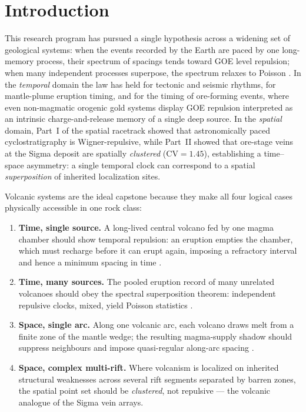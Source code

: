 \documentclass[11pt]{article}
\begin{document}
\section{Introduction}

This research program has pursued a single hypothesis across a widening set of
geological systems: when the events recorded by the Earth are paced by one
long-memory process, their spectrum of spacings tends toward GOE level
repulsion; when many independent processes superpose, the spectrum relaxes to
Poisson \citep{mehta2004,atas2013}. In the \emph{temporal} domain the law has
held for tectonic and seismic rhythms, for mantle-plume eruption timing, and
for the timing of ore-forming events, where even non-magmatic orogenic gold
systems display GOE repulsion interpreted as an intrinsic charge-and-release
memory of a single deep source. In the \emph{spatial} domain, Part~I of the
spatial racetrack showed that astronomically paced cyclostratigraphy is
Wigner-repulsive, while Part~II showed that ore-stage veins at the Sigma
deposit are spatially \emph{clustered} ($\mathrm{CV}=1.45$), establishing a
time--space asymmetry: a single temporal clock can correspond to a spatial
\emph{superposition} of inherited localization sites.

Volcanic systems are the ideal capstone because they make all four logical
cases physically accessible in one rock class:

\begin{enumerate}
\item \textbf{Time, single source.} A long-lived central volcano fed by one
magma chamber should show temporal repulsion: an eruption empties the chamber,
which must recharge before it can erupt again, imposing a refractory interval
and hence a minimum spacing in time \citep{sparks2003}.
\item \textbf{Time, many sources.} The pooled eruption record of many unrelated
volcanoes should obey the spectral superposition theorem: independent repulsive
clocks, mixed, yield Poisson statistics \citep{mehta2004}.
\item \textbf{Space, single arc.} Along one volcanic arc, each volcano draws
melt from a finite zone of the mantle wedge; the resulting magma-supply shadow
should suppress neighbours and impose quasi-regular along-arc spacing
\citep{degraffenried2021,vanbemmelen1949}.
\item \textbf{Space, complex multi-rift.} Where volcanism is localized on
inherited structural weaknesses across several rift segments separated by barren
zones, the spatial point set should be \emph{clustered}, not repulsive ---
the volcanic analogue of the Sigma vein arrays.
\end{enumerate}
\end{document}
